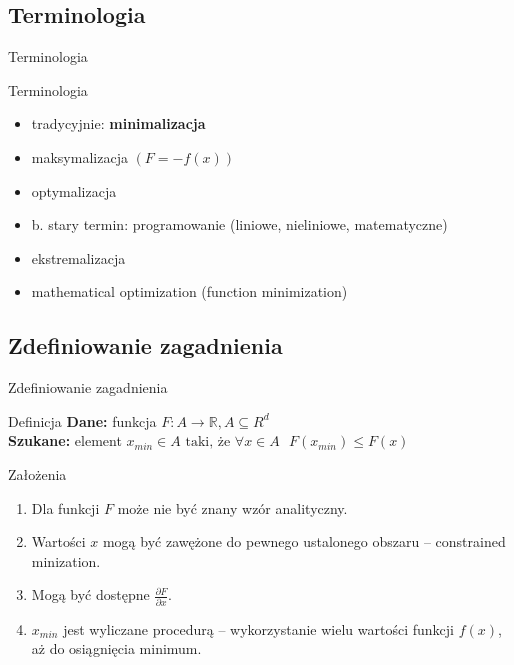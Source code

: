 \subsection{Terminologia}

  \begin{frame}{Terminologia}
    \begin{block}{Terminologia}
      \begin{itemize}
        \item tradycyjnie: \textbf{minimalizacja}
        \item maksymalizacja $(F = -f(x))$
        \item optymalizacja 
        \item b. stary termin: programowanie (liniowe,
        nieliniowe, matematyczne)
        \item ekstremalizacja
        \item mathematical optimization (function minimization)
      \end{itemize}
    \end{block}
  \end{frame}

\subsection{Zdefiniowanie zagadnienia}

  \begin{frame}{Zdefiniowanie zagadnienia}
    \begin{block}{Definicja}
      \textbf{Dane:} funkcja 
      $F: A \rightarrow \mathbb{R}, A \subseteq R^d $ \\
      \textbf{Szukane:} element $ x_{min} \in A \text{ taki, że } \forall x \in A \text{ } F(x_{min}) \le F(x) $
    \end{block}

    \begin{block}{Założenia}
      \begin{enumerate}
        \item Dla funkcji $ F $ może nie być znany wzór analityczny.
        \item Wartości $ x $ mogą być zawężone do pewnego
        ustalonego obszaru -- constrained minization.
        \item Mogą być dostępne $ \frac{\partial F}{\partial x} $.
        \item $ x_{min} $ jest wyliczane procedurą -- wykorzystanie wielu wartości funkcji $ f(x) $,
        aż do osiągnięcia minimum.
      \end{enumerate}
    \end{block}
  \end{frame}

